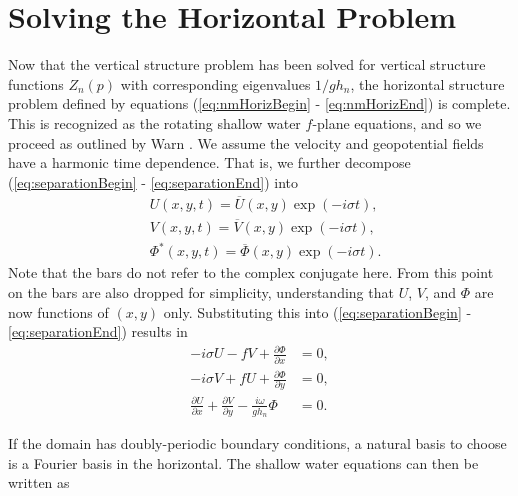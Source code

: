 \section{Solving the Horizontal Problem}
\label{sec:horiz}
Now that the vertical structure problem has been solved for vertical structure functions $Z_n(p)$ with corresponding eigenvalues $1/gh_n$, the horizontal structure problem defined by equations (\ref{eq:nmHorizBegin} - \ref{eq:nmHorizEnd}) is complete. This is recognized as the rotating shallow water $f$-plane equations, and so we proceed as outlined by Warn \cite{Warn1986a}. We assume the velocity and geopotential fields have a harmonic time dependence. That is, we further decompose (\ref{eq:separationBegin} - \ref{eq:separationEnd}) into
\begin{align}
&U(x,y,t) = \overline{U}(x,y) \exp{\left(-i \sigma t \right) }, \label{eq:harmonicBegin}\\
&V(x,y,t) = \overline{V}(x,y) \exp{\left(-i \sigma t \right) },\\
&\Phi^*(x,y,t) = \overline{\Phi}(x,y) \exp{\left(-i \sigma t \right)}. \label{eq:harmonicEnd}
\end{align}
Note that the bars do not refer to the complex conjugate here. From this point on the bars are also dropped for simplicity, understanding that $U$, $V$, and $\Phi$ are now functions of $(x,y)$ only. Substituting this into (\ref{eq:separationBegin} - \ref{eq:separationEnd}) results in 
\begin{align}
-i\sigma U - fV + \frac{\partial \Phi}{\partial x} &= 0,\\
-i\sigma V + fU + \frac{\partial \Phi}{\partial y} &= 0,\\
\frac{\partial U}{\partial x} + \frac{\partial V}{\partial y} - \frac{i\omega}{gh_n} \Phi &= 0.
\end{align}

If the domain has doubly-periodic boundary conditions, a natural basis to choose is a Fourier basis in the horizontal. The shallow water equations can then be written as

